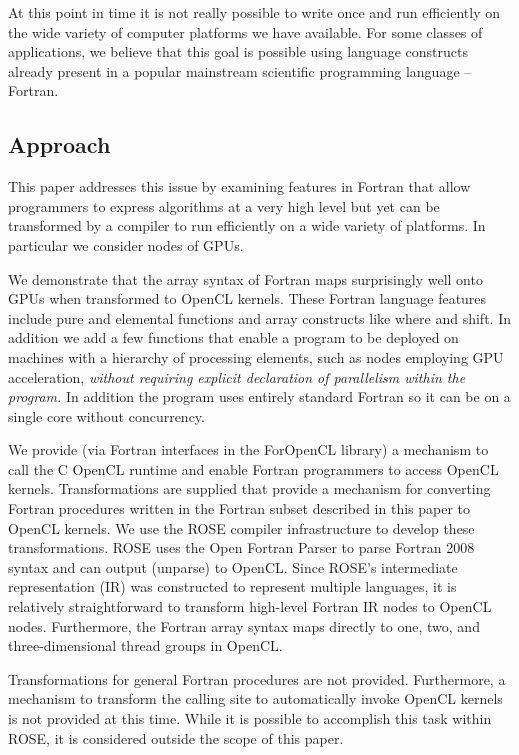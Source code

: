 \documentclass[10pt, conference, compsocconf]{IEEEtran}
\begin{document}
At this point in time it is not really possible to write once and
run efficiently on the wide variety of computer platforms we have
available.  For some classes of applications, we believe that this goal
is possible using language constructs already present in a popular
mainstream scientific programming language -- Fortran.

\subsection{Approach}

This paper addresses this issue by examining features in Fortran that
allow programmers to express algorithms at a very high level but yet
can be transformed by a compiler to run efficiently on a wide variety
of platforms.  In particular we consider nodes of GPUs.

We demonstrate that the array syntax of Fortran maps surprisingly well
onto GPUs when transformed to OpenCL kernels.  These Fortran language
features include pure and elemental functions and array constructs
like where and shift.  In addition we add a few functions that enable
a program to be deployed on machines with a hierarchy of processing
elements, such as nodes employing GPU acceleration, \emph{without
  requiring explicit declaration of parallelism within the program.}
In addition the program uses entirely standard Fortran so it can be on
a single core without concurrency.

We provide (via Fortran interfaces in the ForOpenCL library) a mechanism to
call the C OpenCL runtime and enable Fortran programmers to access OpenCL
kernels.  Transformations are supplied that provide a mechanism for converting
Fortran procedures written in the Fortran subset described in this paper to
OpenCL kernels.  We use the ROSE compiler infrastructure \cite{} to develop
these transformations.  ROSE uses the Open Fortran Parser \cite{} to parse
Fortran 2008 syntax and can output (unparse) to OpenCL.  Since ROSE's
intermediate representation (IR) was constructed to represent multiple
languages, it is relatively straightforward to transform high-level Fortran IR
nodes to OpenCL nodes.  Furthermore, the Fortran array syntax maps directly to
one, two, and three-dimensional thread groups in OpenCL.

Transformations for general Fortran procedures are not provided.  Furthermore,
a mechanism to transform the calling site to automatically invoke
OpenCL kernels is not provided at this time.  While it is possible to
accomplish this task within ROSE, it is considered outside the scope of this
paper.
\end{document}
